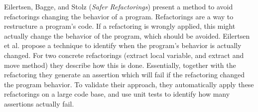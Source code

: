 

Eilertsen, Bagge, and Stolz
\cite{isola-2016-eilertsen}
({\em Safer Refactorings})
present a method to avoid refactorings changing the behavior
of a program. 
Refactorings are a way to restructure a program's code. If a
refactoring is wrongly applied, this might actually change the
behavior of the program, which should be avoided. Eilertsen et al. propose a technique to identify when the program's behavior is actually changed. For two concrete refactorings (extract local variable, and extract and move method) they describe how this is done. Essentially, together with the refactoring they generate an assertion which will fail if the refactoring changed the program behavior. To validate their approach, they automatically apply these refactorings on a large code base, and use unit tests to identify how many assertions actually fail.
